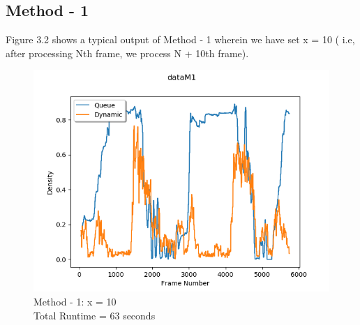 \documentclass[paper=a4, fontsize = 12pt]{scrartcl}
\numberwithin{equation}{section}		%
\numberwithin{figure}{section}			%
\numberwithin{table}{section}				%
\begin{document}
\subsection{Method - 1}
Figure 3.2 shows a typical output of Method - 1 wherein we have set x = 10 ( i.e, after processing Nth frame, we process N + 10th frame).

\begin{figure}[ht!]
    \centering
    \captionsetup{justification=centering,margin=2cm}
    \includegraphics[width=15cm]{dataM1.png}
    \caption{ Method - 1: x = 10 \\Total Runtime = 63 seconds}
    \label{fig:typicalM1}
\end{figure}
\end{document}
